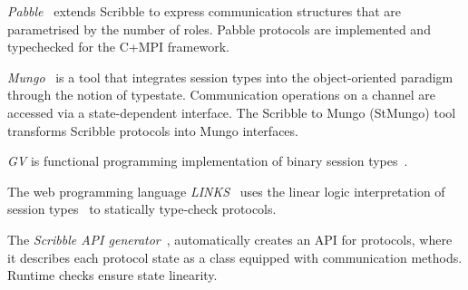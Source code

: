{\em Pabble}~\cite{pabble:NY15} extends Scribble to express communication
structures that are parametrised by the number of roles.
Pabble protocols are implemented and typechecked for the C+MPI framework.

{\em Mungo}~\cite{mungo} is a tool that integrates session types into the object-oriented
paradigm through the notion of typestate. Communication
operations on a channel are accessed via a state-dependent interface.
The Scribble to Mungo (StMungo) tool transforms Scribble
protocols into Mungo interfaces.


{\em GV} is functional programming implementation of binary session types~\cite{DBLP:journals/jfp/Wadler14}.

The web programming language {\em LINKS}~\cite{citation_needed}
uses the linear logic interpretation of session types~\cite{DBLP:journals/jfp/Wadler14}
to statically type-check protocols.

The {\em Scribble API generator}~\cite{HY2016}, automatically creates an API for protocols,
where it describes each protocol state as a class equipped with
communication methods. Runtime checks ensure state linearity.






